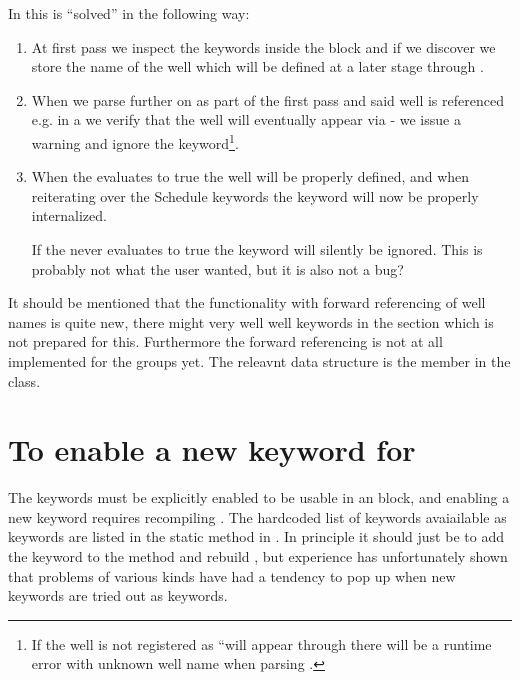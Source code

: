 In \flow{} this is ``solved'' in the following way:
\begin{enumerate}
\item At first pass we inspect the keywords inside the \actionx{} block and if
  we discover  we store the name of the well which will be defined
  at a later stage through \actionx{}.
\item When we parse further on as part of the first pass and said well is
  referenced e.g. in a  we verify that the well will eventually
  appear via \actionx{} - we issue a warning and ignore the 
  keyword\footnote{If the well is not registered as ``will appear through
  \actionx{} there will be a runtime error with unknown well name when parsing
  .}.
\item When the \actionx{} evaluates to true the well will be properly defined,
  and when reiterating over the Schedule keywords the  keyword will
  now be properly internalized.

  If the \actionx{} never evaluates to true the  keyword will
  silently be ignored. This is probably not what the user wanted, but it is also
  not a bug?
\end{enumerate}
It should be mentioned that the functionality with forward referencing of well
names is quite new, there might very well well keywords in the 
section which is not prepared for this. Furthermore the forward referencing is
not at all implemented for the groups yet. The releavnt data structure is the
member  in the 
class.



\section{To enable a new keyword for \actionx}
The keywords must be explicitly enabled to be usable in an \actionx{} block, and
enabling a new keyword requires recompiling \flow{}. The hardcoded list of
keywords avaiailable as \actionx{} keywords are listed in the static method
 in
. In principle it should
just be to add the keyword to the  method
and rebuild \flow{}, but experience has unfortunately shown that problems of
various kinds have had a tendency to pop up when new keywords are tried out as
\actionx{} keywords.

